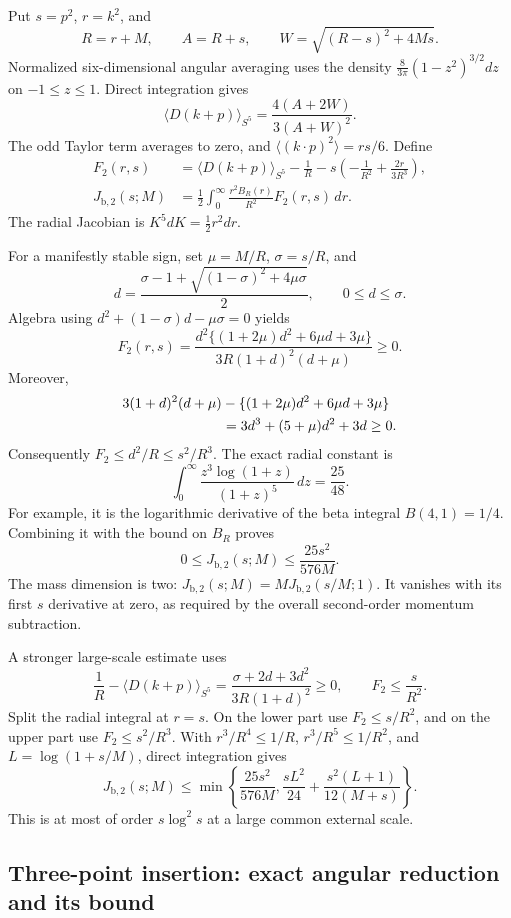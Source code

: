 Put $s=p^2$, $r=k^2$, and
\[
 R=r+M,\qquad A=R+s,\qquad W=\sqrt{(R-s)^2+4Ms}.
\]
Normalized six-dimensional angular averaging uses the density
$\frac8{3\pi}(1-z^2)^{3/2}dz$ on $-1\le z\le1$. Direct integration gives
\[
 \langle D(k+p)\rangle_{S^5}
        =\frac{4(A+2W)}{3(A+W)^2}.
\]
The odd Taylor term averages to zero, and
$\langle(k\cdot p)^2\rangle=rs/6$. Define
\begin{align*}
 F_2(r,s)&=\langle D(k+p)\rangle_{S^5}-\frac1R
                    -s\left(-\frac1{R^2}+\frac{2r}{3R^3}\right),\\
 J_{\mathrm{b},2}(s;M)
       &=\frac12\int_0^\infty\frac{r^2B_R(r)}{R^2}F_2(r,s)\,dr.
\end{align*}
The radial Jacobian is $K^5dK=\frac12r^2dr$.

For a manifestly stable sign, set $\mu=M/R$, $\sigma=s/R$, and
\[
 d=\frac{\sigma-1+\sqrt{(1-\sigma)^2+4\mu\sigma}}2,
 \qquad 0\le d\le\sigma.
\]
Algebra using $d^2+(1-\sigma)d-\mu\sigma=0$ yields
\[
 F_2(r,s)=\frac{d^2\{(1+2\mu)d^2+6\mu d+3\mu\}}
                     {3R(1+d)^2(d+\mu)}\ge0.
\]
Moreover,
\begin{align*}
 &3(1+d)^2(d+\mu)-\{(1+2\mu)d^2+6\mu d+3\mu\}\\
 &\hspace{25mm}=3d^3+(5+\mu)d^2+3d\ge0.
\end{align*}
Consequently $F_2\le d^2/R\le s^2/R^3$. The exact radial constant is
\[
 \int_0^\infty\frac{z^3\log(1+z)}{(1+z)^5}\,dz=\frac{25}{48}.
\]
For example, it is the logarithmic derivative of the beta integral
$B(4,1)=1/4$. Combining it with the bound on $B_R$ proves
\[
 0\le J_{\mathrm{b},2}(s;M)\le\frac{25s^2}{576M}.
\]
The mass dimension is two:
$J_{\mathrm{b},2}(s;M)=M J_{\mathrm{b},2}(s/M;1)$.
It vanishes with its first $s$ derivative at zero, as required by the
overall second-order momentum subtraction.

A stronger large-scale estimate uses
\[
 \frac1R-\langle D(k+p)\rangle_{S^5}
   =\frac{\sigma+2d+3d^2}{3R(1+d)^2}\ge0,
 \qquad F_2\le\frac{s}{R^2}.
\]
Split the radial integral at $r=s$. On the lower part use $F_2\le s/R^2$,
and on the upper part use $F_2\le s^2/R^3$. With
$r^3/R^4\le1/R$, $r^3/R^5\le1/R^2$, and
$L=\log(1+s/M)$, direct integration gives
\[
 J_{\mathrm{b},2}(s;M)\le
 \min\left\{\frac{25s^2}{576M},
       \frac{sL^2}{24}+\frac{s^2(L+1)}{12(M+s)}\right\}.
\]
This is at most of order $s\log^2s$ at a large common external scale.

\subsection{Three-point insertion: exact angular reduction and its bound}

